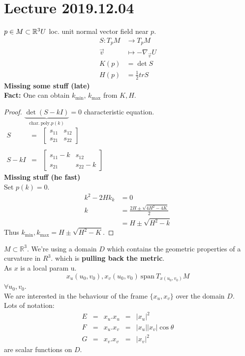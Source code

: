 \documentclass{article}
\newcommand{\R}{\mathbb{R}}
\newcommand{\abs}[1]{\left|#1\right|}
\theoremstyle{definition}
\theoremstyle{remark}
\theoremstyle{example}
\begin{document}
	\section*{Lecture 2019.12.04}
	$p \in M \subset \R^3\\
	U$ loc. unit normal vector field near $p$.
	\begin{align*}
		S:T_pM & \to T_pM\\
		\vec{v}&\mapsto -\nabla_{\vec{v}}U\\
		K(p) &= \det S\\
		H(p) &= \frac12 tr S
	\end{align*}
	\textbf{Missing some stuff (late)}\\
	\textbf{Fact:} One can obtain $k_{\min}$, $k_{\max}$ from $K,H$.
	\begin{proof}
		$\underbrace{\det (S-kI)}_{\mathrm{char.\ poly.} p(k)}=0$ characteristic equation.
		$\begin{matrix}
			S&=&\begin{bmatrix}
			s_{11} & s_{12}\\
			s_{21} & s_{22}
			\end{bmatrix}\\\\
			S-kI &=&\begin{bmatrix}
			s_{11}-k & s_{12}\\
			s_{21} & s_{22} -k
			\end{bmatrix}
		\end{matrix}$\\
		\textbf{Missing stuff (he fast)}\\
		Set $p(k)=0$.
		\begin{align*}
			k^2-2Hk_k & = 0\\
			k&=\frac{2H \pm \sqrt{4H^2-4K}}{2}\\
			&=H \pm \sqrt{H^2-k}
		\end{align*}
		Thus $k_{\min}, k_{\max} = H \pm \sqrt{H^2-K}$.
	\end{proof}
	$M \subset \R^3$. We're using a domain $D$ which contains the geometric properties of a curvature in $R^3$. which is \textbf{pulling back the metric}.\\
	As $x$ is a local param u.\\
	\[ x_u(u_0,v_0),x_v(u_0,v_0)\ \mathrm{span}\ T_{x(u_0,v_0)}M\]
	$\forall u_0,v_0$.\\
	We are interested in the behaviour of the frame $\{x_u,x_v\}$ over the domain $D$.\\
	Lots of notation:
	\[\begin{matrix}
		E &=& x_u.x_u &=& \abs{x_u}^2\\
		F &=& x_u.x_v &=& \abs{x_u}\abs{x_v}\cos \theta\\
		G &=& x_v.x_v &=& \abs{x_v}^2
	\end{matrix}\] are scalar functions on $D$.\\
\end{document}
